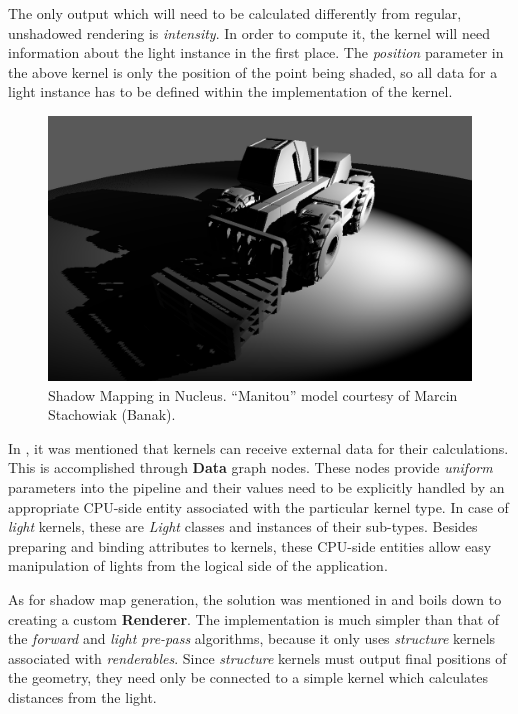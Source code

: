 The only output which will need to be calculated differently from regular, unshadowed rendering is \emph{intensity}. In order to compute it, the kernel will need information about the light instance in the first place. The \emph{position} parameter in the above kernel is only the position of the point being shaded, so all data for a light instance has to be defined within the implementation of the kernel.

\begin{figure}[ht!]
  \centering
    \includegraphics[width=0.9\linewidth]{./Figures/shadowMapping/manitouSM.png}
    \caption[SM in Nucleus]{Shadow Mapping in Nucleus. ``Manitou'' model courtesy of Marcin Stachowiak (Banak).}
  \label{fig:NucleusSM}
\end{figure}

In , it was mentioned that kernels can receive external data for their calculations. This is accomplished through \textbf{Data} graph nodes. These nodes provide \emph{uniform} parameters into the pipeline and their values need to be explicitly handled by an appropriate CPU-side entity associated with the particular kernel type. In case of \emph{light} kernels, these are \emph{Light} classes and instances of their sub-types. Besides preparing and binding attributes to kernels, these CPU-side entities allow easy manipulation of lights from the logical side of the application.

As for shadow map generation, the solution was mentioned in  and boils down to creating a custom \textbf{Renderer}. The implementation is much simpler than that of the \emph{forward} and \emph{light pre-pass} algorithms, because it only uses \emph{structure} kernels associated with \emph{renderables}. Since \emph{structure} kernels must output final positions of the geometry, they need only be connected to a simple kernel which calculates distances from the light.

